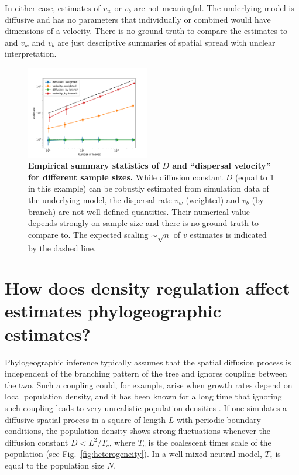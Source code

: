 \documentclass[aps,rmp, twocolumn]{revtex4}
\begin{document}
In either case, estimates of $v_w$ or $v_b$ are not meaningful. 
The underlying model is diffusive and has no parameters that individually or combined would have dimensions of a velocity. 
There is no ground truth to compare the estimates to and $v_w$ and $v_b$ are just descriptive summaries of spatial spread with unclear interpretation.


\begin{figure}[tb]
    \includegraphics*[width=0.48\textwidth]{figures/kingman_dispersal.pdf}
    \caption{\label{fig:D_and_v}{\bf Empirical summary statistics of $D$ and ``dispersal velocity'' for different sample sizes.}
    While diffusion constant $D$ (equal to 1 in this example) can be robustly estimated from simulation data of the underlying model, the dispersal rate $v_w$ (weighted) and $v_b$ (by branch) are not well-defined quantities. Their numerical value depends strongly on sample size and there is no ground truth to compare to. The expected scaling $\sim \sqrt{n}$ of $v$ estimates is indicated by the dashed line.}
\end{figure}

\section*{How does density regulation affect estimates phylogeographic estimates?}
Phylogeographic inference typically assumes that the spatial diffusion process is independent of the branching pattern of the tree and ignores coupling between the two. 
Such a coupling could, for example, arise when growth rates depend on local population density, and it has been known for a long time that ignoring such coupling leads to very unrealistic population densities \citep{felsenstein_pain_1975}.
If one simulates a diffusive spatial process in a square of length $L$ with periodic boundary conditions, the population density shows strong fluctuations whenever the diffusion constant $D<L^2/T_c$, where $T_c$ is the coalescent times scale of the population (see Fig.~\ref{fig:heterogeneity}).
In a well-mixed neutral model, $T_c$ is equal to the population size $N$.  
\end{document}
